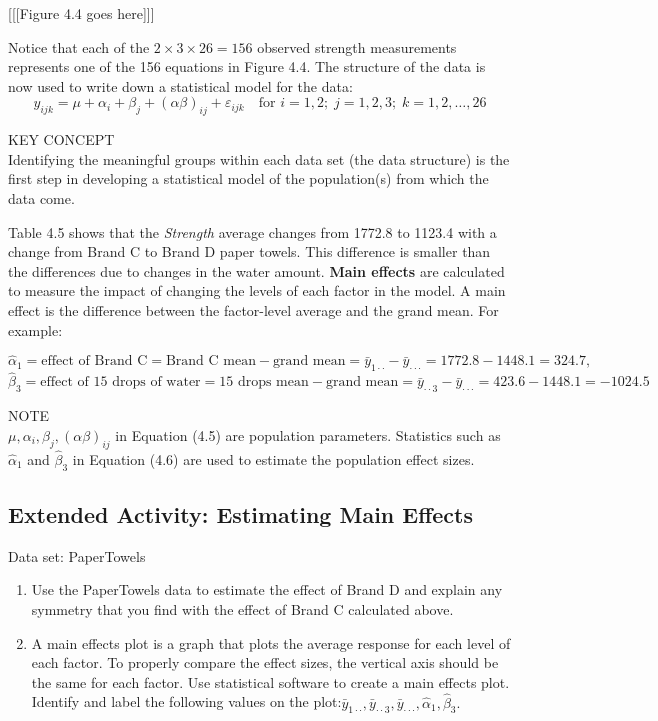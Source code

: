 \documentclass[
]{report}
\theoremstyle{definition}
\theoremstyle{definition}
\theoremstyle{definition}
\theoremstyle{definition}
\theoremstyle{remark}
\begin{document}
{[}{[}{[}Figure 4.4 goes here{]}{]}{]}

Notice that each of the \(2 \times 3 \times 26 = 156\) observed strength measurements represents one of the 156 equations in Figure 4.4. The structure of the data is now used to write down a statistical model for the data:
\[
y_{ijk} = \mu + \alpha_i + \beta_j + (\alpha\beta)_{ij} + \varepsilon_{ijk}
\quad\text{for } i = 1,2;\; j = 1,2,3;\; k = 1,2,\dots,26
\tag{4.5}
\]

KEY CONCEPT\\
Identifying the meaningful groups within each data set (the data structure) is the first step in developing a statistical model of the population(s) from which the data come.

Table 4.5 shows that the \emph{Strength} average changes from 1772.8 to 1123.4 with a change from Brand C to Brand D paper towels. This difference is smaller than the differences due to changes in the water amount. \textbf{Main effects} are calculated to measure the impact of changing the levels of each factor in the model. A main effect is the difference between the factor-level average and the grand mean. For example:

\[
\hat\alpha_1
= \text{effect of Brand C}
= \text{Brand C mean} - \text{grand mean}
= \bar y_{1\cdot\cdot} - \bar y_{\cdot\cdot\cdot}
= 1772.8 - 1448.1
= 324.7,
\]
\[
\hat\beta_3
= \text{effect of 15 drops of water}
= \text{15 drops mean} - \text{grand mean}
= \bar y_{\cdot\cdot3} - \bar y_{\cdot\cdot\cdot}
= 423.6 - 1448.1
= -1024.5
\tag{4.6}
\]

NOTE\\
\(\mu,\alpha_i,\beta_j,(\alpha\beta)_{ij}\) in Equation (4.5) are population parameters. Statistics such as \(\hat\alpha_1\) and \(\hat\beta_3\) in Equation (4.6) are used to estimate the population effect sizes.

\hypertarget{extended-activity-estimating-main-effects}{%
\subsection{Extended Activity: Estimating Main Effects}\label{extended-activity-estimating-main-effects}}

Data set: PaperTowels

\begin{enumerate}
\def\labelenumi{\arabic{enumi}.}
\setcounter{enumi}{23}
\item
  Use the PaperTowels data to estimate the effect of Brand D and explain any symmetry that you find with the effect of Brand C calculated above.
\item
  A main effects plot is a graph that plots the average response for each level of each factor. To properly compare the effect sizes, the vertical axis should be the same for each factor. Use statistical software to create a main effects plot. Identify and label the following values on the plot:\(\bar y_{1\cdot\cdot},\bar y_{\cdot\cdot3},\bar y_{\cdot\cdot\cdot}, \hat\alpha_1, \hat\beta_3.\)
\end{enumerate}
\end{document}
